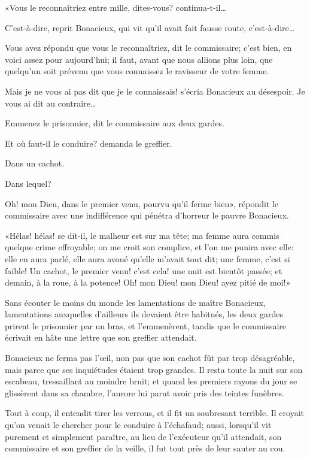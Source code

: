 «Vous le reconnaîtriez entre mille, dites-vous? continua-t-il\dots 

\speak  C'est-à-dire, reprit Bonacieux, qui vit qu'il avait fait fausse route, c'est-à-dire\dots 

\speak  Vous avez répondu que vous le reconnaîtriez, dit le commissaire; c'est bien, en voici assez pour aujourd'hui; il faut, avant que nous allions plus loin, que quelqu'un soit prévenu que vous connaissez le ravisseur de votre femme. 

\speak  Mais je ne vous ai pas dit que je le connaissais! s'écria Bonacieux au désespoir. Je vous ai dit au contraire\dots 

\speak  Emmenez le prisonnier, dit le commissaire aux deux gardes. 

\speak  Et où faut-il le conduire? demanda le greffier. 

\speak  Dans un cachot. 

\speak  Dans lequel? 

\speak  Oh! mon Dieu, dans le premier venu, pourvu qu'il ferme bien», répondit le commissaire avec une indifférence qui pénétra d'horreur le pauvre Bonacieux. 

«Hélas! hélas! se dit-il, le malheur est sur ma tête; ma femme aura commis quelque crime effroyable; on me croit son complice, et l'on me punira avec elle: elle en aura parlé, elle aura avoué qu'elle m'avait tout dit; une femme, c'est si faible! Un cachot, le premier venu! c'est cela! une nuit est bientôt passée; et demain, à la roue, à la potence! Oh! mon Dieu! mon Dieu! ayez pitié de moi!» 

Sans écouter le moins du monde les lamentations de maître Bonacieux, lamentations auxquelles d'ailleurs ils devaient être habitués, les deux gardes prirent le prisonnier par un bras, et l'emmenèrent, tandis que le commissaire écrivait en hâte une lettre que son greffier attendait. 

Bonacieux ne ferma pas l'œil, non pas que son cachot fût par trop désagréable, mais parce que ses inquiétudes étaient trop grandes. Il resta toute la nuit sur son escabeau, tressaillant au moindre bruit; et quand les premiers rayons du jour se glissèrent dans sa chambre, l'aurore lui parut avoir pris des teintes funèbres. 

Tout à coup, il entendit tirer les verrous, et il fit un soubresaut terrible. Il croyait qu'on venait le chercher pour le conduire à l'échafaud; aussi, lorsqu'il vit purement et simplement paraître, au lieu de l'exécuteur qu'il attendait, son commissaire et son greffier de la veille, il fut tout près de leur sauter au cou. 

